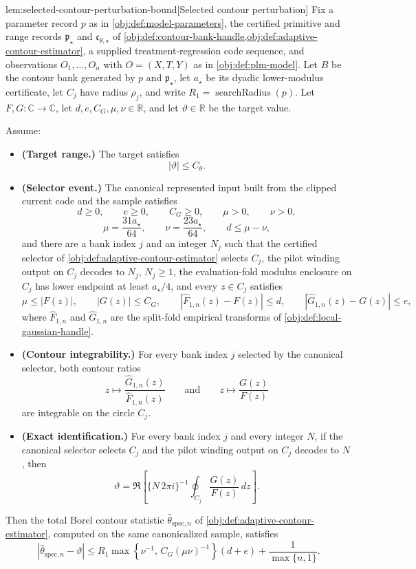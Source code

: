 \begin{lemmav}{lem:selected-contour-perturbation-bound}[Selected contour perturbation]
Fix a parameter record \(p\) as in \cref{obj:def:model-parameters}, the certified primitive and range records \(\mathfrak p_{\star}\) and \(\mathfrak c_{\theta,\star}\) of \cref{obj:def:contour-bank-handle,obj:def:adaptive-contour-estimator}, a supplied treatment-regression code sequence, and observations \(O_1,\ldots,O_n\) with \(O=(X,T,Y)\) as in \cref{obj:def:plm-model}.  Let \(B\) be the contour bank generated by \(p\) and \(\mathfrak p_{\star}\), let \(a_{\star}\) be its dyadic lower-modulus certificate, let \(C_j\) have radius \(\rho_j\), and write \(R_1=\operatorname{searchRadius}(p)\).  Let \(F,G:\mathbb C\to\mathbb C\), let \(d,e,C_G,\mu,\nu\in\mathbb R\), and let \(\vartheta\in\mathbb R\) be the target value.

Assume:
\begin{itemize}
\item \textbf{(Target range.)} The target satisfies
\[
|\vartheta|\le C_{\theta}.
\]
\item \textbf{(Selector event.)} The canonical represented input built from the clipped current code and the sample satisfies
\[
d\ge0,\qquad e\ge0,\qquad C_G\ge0,\qquad \mu>0,\qquad \nu>0,
\]
\[
\mu=\frac{31a_{\star}}{64},\qquad \nu=\frac{23a_{\star}}{64},\qquad d\le \mu-\nu,
\]
and there are a bank index \(j\) and an integer \(N_j\) such that the certified selector of \cref{obj:def:adaptive-contour-estimator} selects \(C_j\), the pilot winding output on \(C_j\) decodes to \(N_j\), \(N_j\ge1\), the evaluation-fold modulus enclosure on \(C_j\) has lower endpoint at least \(a_{\star}/4\), and every \(z\in C_j\) satisfies
\[
\mu\le |F(z)|,\qquad |G(z)|\le C_G,\qquad
|\widehat F_{1,n}(z)-F(z)|\le d,\qquad
|\widehat G_{1,n}(z)-G(z)|\le e,
\]
where \(\widehat F_{1,n}\) and \(\widehat G_{1,n}\) are the split-fold empirical transforms of \cref{obj:def:local-gaussian-handle}.
\item \textbf{(Contour integrability.)} For every bank index \(j\) selected by the canonical selector, both contour ratios
\[
z\mapsto \frac{\widehat G_{1,n}(z)}{\widehat F_{1,n}(z)}
\qquad\text{and}\qquad
z\mapsto \frac{G(z)}{F(z)}
\]
are integrable on the circle \(C_j\).
\item \textbf{(Exact identification.)} For every bank index \(j\) and every integer \(N\), if the canonical selector selects \(C_j\) and the pilot winding output on \(C_j\) decodes to \(N\), then
\[
\vartheta
=
\Re\left[
\{N\,2\pi i\}^{-1}
\oint_{C_j}\frac{G(z)}{F(z)}\,dz
\right].
\]
\end{itemize}
Then the total Borel contour statistic \(\widehat\theta_{\mathrm{spec},n}\) of \cref{obj:def:adaptive-contour-estimator}, computed on the same canonicalized sample, satisfies
\[
\left|\widehat\theta_{\mathrm{spec},n}-\vartheta\right|
\le
R_1\max\left\{\nu^{-1},\,C_G(\mu\nu)^{-1}\right\}(d+e)
+
\frac{1}{\max\{n,1\}}.
\]
\end{lemmav}

